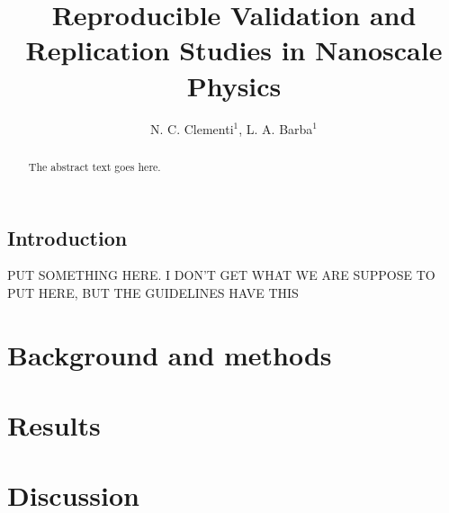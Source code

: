 \documentclass[openacc]{rstransa} %
\begin{document}
\title{Reproducible Validation and Replication Studies in Nanoscale Physics}

\author{%
N. C. Clementi$^{1}$, L. A. Barba$^{1}$}

\address{$^{1}$Department of Mechanical and Aerospace Engineering, 
The George Washington University, Washington D.C., USA }

\subject{validation and verification, reproducibility and replication, computational modeling, computational physics, research software}



\begin{abstract}
    The abstract text goes here. 
\end{abstract}
    
    
\begin{fmtext}  
\section{Introduction}

PUT SOMETHING HERE. I DON'T GET WHAT WE ARE SUPPOSE TO PUT HERE, BUT THE GUIDELINES HAVE THIS

\end{fmtext}

\maketitle
\section{Background and methods}\label{sec:background}


\section{Results} \label{sec:results}



\section{Discussion}\label{sec:discussion}



\end{document}

